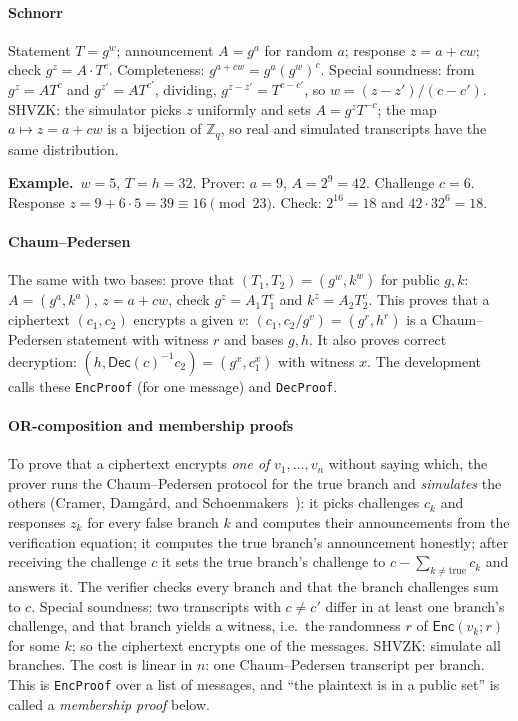 \documentclass[11pt,a4paper]{article}
\newcommand{\Z}{\mathbb{Z}}
\newcommand{\Enc}{\mathsf{Enc}}
\newcommand{\Dec}{\mathsf{Dec}}
\newcommand{\rocq}[1]{\texttt{#1}}
\newcommand{\ex}[1]{\par\medskip\noindent\textbf{Example.}~#1\par\medskip}
\theoremstyle{remark}
\begin{document}
\paragraph{Schnorr} Statement $T = g^w$; announcement $A = g^a$ for random
$a$; response $z = a + c w$; check $g^z = A \cdot T^c$. Completeness:
$g^{a + cw} = g^a (g^w)^c$. Special soundness: from $g^z = A T^c$ and
$g^{z'} = A T^{c'}$, dividing, $g^{z - z'} = T^{c - c'}$, so $w = (z -
z')/(c - c')$. SHVZK: the simulator picks $z$ uniformly and sets $A = g^z
T^{-c}$; the map $a \mapsto z = a + cw$ is a bijection of $\Z_q$, so real and
simulated transcripts have the same distribution.

\ex{$w = 5$, $T = h = 32$. Prover: $a = 9$, $A = 2^9 = 42$. Challenge $c =
6$. Response $z = 9 + 6 \cdot 5 = 39 \equiv 16 \pmod{23}$. Check: $2^{16} =
18$ and $42 \cdot 32^6 = 18$.}

\paragraph{Chaum--Pedersen} The same with two bases: prove that $(T_1, T_2)
= (g^w, k^w)$ for public $g, k$: $A = (g^a, k^a)$, $z = a + cw$, check
$g^z = A_1 T_1^c$ and $k^z = A_2 T_2^c$. This proves that a ciphertext
$(c_1, c_2)$ encrypts a given $v$: $(c_1, c_2 / g^v) = (g^r, h^r)$ is a
Chaum--Pedersen statement with witness $r$ and bases $g, h$. It also proves
correct decryption: $(h, \Dec(c)^{-1} c_2) = (g^x, c_1^x)$ with witness
$x$. The development calls these \rocq{EncProof} (for one message) and
\rocq{DecProof}.

\paragraph{OR-composition and membership proofs} To prove that a ciphertext
encrypts \emph{one of} $v_1, \ldots, v_n$ without saying which, the prover
runs the Chaum--Pedersen protocol for the true branch and \emph{simulates}
the others (Cramer, Damg{\aa}rd, and Schoenmakers~\cite{cds}): it picks challenges
$c_k$ and responses $z_k$ for every false branch $k$ and computes their
announcements from the verification equation; it computes the true branch's
announcement honestly; after receiving the challenge $c$ it sets the true
branch's challenge to $c - \sum_{k \ne \text{true}} c_k$ and answers it.
The verifier checks every branch and that the branch challenges sum to
$c$. Special soundness: two transcripts with $c \ne c'$ differ in at least
one branch's challenge, and that branch yields a witness, i.e.\ the
randomness $r$ of $\Enc(v_k; r)$ for some $k$; so the ciphertext encrypts
one of the messages. SHVZK: simulate all branches. The cost is linear in
$n$: one Chaum--Pedersen transcript per branch. This is \rocq{EncProof}
over a list of messages, and ``the plaintext is in a public set'' is called
a \emph{membership proof} below.
\end{document}
